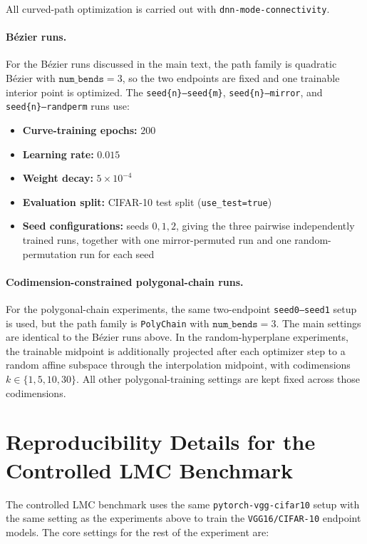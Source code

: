\documentclass[11pt,a4paper]{report}
\begin{document}
All curved-path optimization is carried out with \texttt{dnn-mode-connectivity}.

\paragraph{Bézier runs.}
For the Bézier runs discussed in the main text, the path family is quadratic Bézier with \(\texttt{num\_bends}=3\), so the two endpoints are fixed and one trainable interior point is optimized. The \texttt{seed\{n\}--seed\{m\}}, \texttt{seed\{n\}--mirror}, and \texttt{seed\{n\}--randperm} runs use:
\begin{itemize}
    \item \textbf{Curve-training epochs:} \(200\)
    \item \textbf{Learning rate:} \(0.015\)
    \item \textbf{Weight decay:} \(5\times 10^{-4}\)
    \item \textbf{Evaluation split:} CIFAR-10 test split (\texttt{use\_test=true})
    \item \textbf{Seed configurations:} seeds \(0,1,2\), giving the three pairwise independently trained runs, together with one mirror-permuted run and one random-permutation run for each seed
\end{itemize}


\paragraph{Codimension-constrained polygonal-chain runs.}
For the polygonal-chain experiments, the same two-endpoint \texttt{seed0--seed1} setup is used, but the path family is \texttt{PolyChain} with \(\texttt{num\_bends}=3\). The main settings are identical to the Bézier runs above.
In the random-hyperplane experiments, the trainable midpoint is additionally projected after each optimizer step to a random affine subspace through the interpolation midpoint, with codimensions \(k \in \{1,5,10,30\}\). All other polygonal-training settings are kept fixed across those codimensions.


\section{Reproducibility Details for the Controlled LMC Benchmark}
\label{app:controlled_benchmark_repro}


The controlled LMC benchmark uses the same \texttt{pytorch-vgg-cifar10} setup with the same setting as the experiments above to train the \texttt{VGG16/CIFAR-10} endpoint models. The core settings for the rest of the experiment are:
\end{document}
